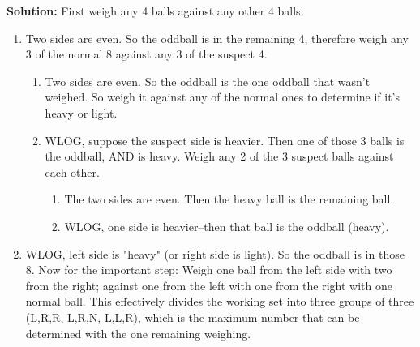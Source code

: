 \documentclass{article}
\providecommand{\soln}{\textbf{Solution: }}
\begin{document}
\begin{enumerate}[label=\Alph*.]
        \soln First weigh any 4 balls against any other 4 balls.
        
        \begin{enumerate}[label=\textbf{Case \arabic*.}]
            \item Two sides are even. So the oddball is in the remaining 4, therefore weigh any 3 of the normal 8 against any 3 of the suspect 4.
            
            \begin{enumerate}[label=(\alph*)]
                \item Two sides are even. So the oddball is the one oddball that wasn't weighed. So weigh it against any of the normal ones to determine if it's heavy or light.
                \item WLOG, suppose the suspect side is heavier. Then one of those 3 balls is the oddball, AND is heavy. Weigh any 2 of the 3 suspect balls against each other.
                
                \begin{enumerate}[label=\roman*]
                    \item The two sides are even. Then the heavy ball is the remaining ball.
                    \item WLOG, one side is heavier--then that ball is the oddball (heavy).
                \end{enumerate}
                
            \end{enumerate}
            
            \item WLOG, left side is "heavy" (or right side is light). So the oddball is in those 8. Now for the important step:
            Weigh one ball from the left side with two from the right; against one from the left with one from the right with one normal ball.
            This effectively divides the working set into three groups of three ({L,R,R}, {L,R,N}, {L,L,R}), which is the maximum number that can be determined with the one remaining weighing.
            

\end{enumerate}
\end{enumerate}
\end{document}
